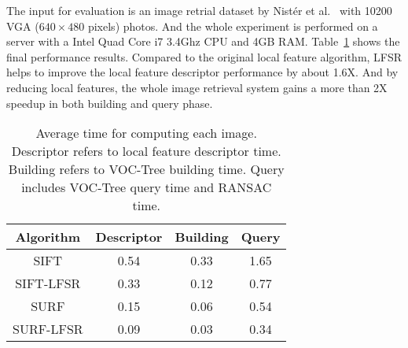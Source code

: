 The input for evaluation is an image retrial dataset by Nist\'er et al.~\cite{nister-stewenius-cvpr-2006} with 10200 VGA ($640\times480$ pixels) photos. And the whole experiment is performed on a server with a Intel Quad Core i7 3.4Ghz CPU and 4GB RAM. Table~\ref{tab:integration} shows the final performance results. Compared to the original local feature algorithm, LFSR helps to improve the local feature descriptor performance by about 1.6X. And by reducing local features, the whole image retrieval system gains a more than 2X speedup in both building and query phase.

\begin{table}
\begin{center}
\begin{tabular}{|c|c|c|c|}
\hline
Algorithm & Descriptor & Building & Query \\
\hline\hline
SIFT & 0.54 & 0.33 & 1.65 \\
SIFT-LFSR & 0.33 & 0.12 & 0.77 \\
\hline\hline
SURF & 0.15 & 0.06 & 0.54 \\
SURF-LFSR & 0.09 & 0.03 & 0.34 \\
\hline
\end{tabular}
\end{center}
\caption{Average time for computing each image. Descriptor refers to local feature descriptor time. Building refers to VOC-Tree building time. Query includes VOC-Tree query time and RANSAC time.}
\label{tab:integration}
\end{table}